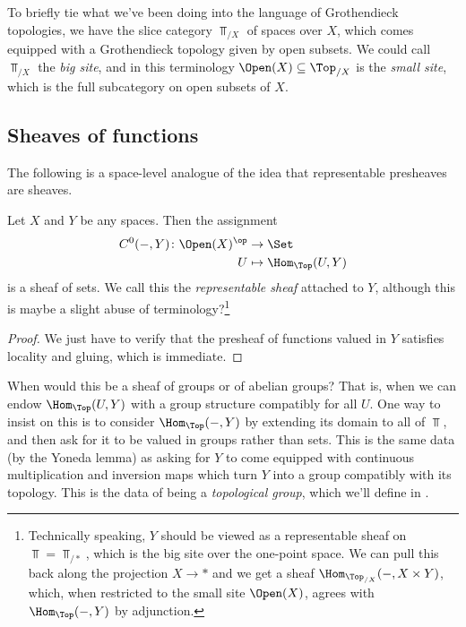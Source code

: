 \documentclass[11pt]{amsart}
\begin{document}
To briefly tie what we've been doing into the language of Grothendieck topologies, we have the slice category $\Top_{/X}$ of spaces over $X$, which comes equipped with a Grothendieck topology given by open subsets. We could call $\Top_{/X}$ the \emph{big site}, and in this terminology $\Open(X) \subseteq \Top_{/X}$ is the \emph{small site}, which is the full subcategory on open subsets of $X$.

\subsection{Sheaves of functions} The following is a space-level analogue of the idea that representable presheaves are sheaves.

\begin{example}
\label{exa:representable-sheaves}
Let $X$ and $Y$ be any spaces. Then the assignment
\begin{align*}
    C^0(-,Y) \colon \Open(X)^\op &\to \Set \\
    U &\mapsto \Hom_\Top(U,Y)
\end{align*}
is a sheaf of sets. We call this the \emph{representable sheaf} attached to $Y$, although this is maybe a slight abuse of terminology?\footnote{Technically speaking, $Y$ should be viewed as a representable sheaf on $\Top = \Top_{/\ast}$, which is the big site over the one-point space. We can pull this back along the projection $X \to \ast$ and we get a sheaf $\Hom_{\Top_{/X}}(-,X \times Y)$, which, when restricted to the small site $\Open(X)$, agrees with $\Hom_{\Top}(-,Y)$ by adjunction.}
\end{example}
\begin{proof} We just have to verify that the presheaf of functions valued in $Y$ satisfies locality and gluing, which is immediate.
\end{proof}

\begin{question} When would this be a sheaf of groups or of abelian groups? That is, when we can endow $\Hom_\Top(U,Y)$ with a group structure compatibly for all $U$. One way to insist on this is to consider $\Hom_\Top(-,Y)$ by extending its domain to all of $\Top$, and then ask for it to be valued in groups rather than sets. This is the same data (by the Yoneda lemma) as asking for $Y$ to come equipped with continuous multiplication and inversion maps which turn $Y$ into a group compatibly with its topology. This is the data of being a \emph{topological group}, which we'll define in .
\end{question}
\end{document}
